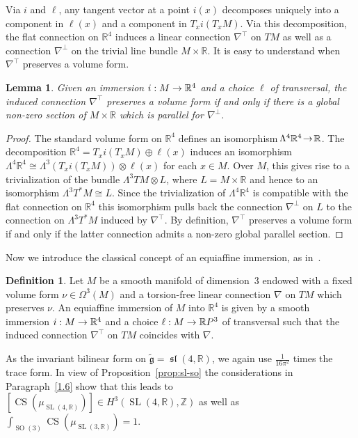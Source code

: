 \documentclass[10pt,a4paper]{amsart}
\newcommand{\x}{\times}
\newcommand{\La}{\Lambda}
\newcommand{\Om}{\Omega}
\DeclareMathOperator{\CS}{CS}
\DeclareMathOperator{\SO}{SO}
\DeclareMathOperator{\SL}{SL}
\DeclareMathOperator{\fksl}{\mathfrak{sl}}
\newcommand*{\R}{\mathbb{R}}
\newcommand{\Z}{\mathbb{Z}}
\newcommand{\tfg}{\widetilde{\mathfrak g}}
\renewcommand*{\to}{\mathchoice{\longrightarrow}{\rightarrow}{\rightarrow}{\rightarrow}}
\newtheorem{lemm}[theo]{Lemma}
\theoremstyle{definition}\newtheorem{defi}[theo]{Definition}
\begin{document}
Via $i$ and $\ell$, any tangent vector at a point $i(x)$ decomposes uniquely into a component in $\ell(x)$ and a component in $T_xi(T_xM)$. Via this decomposition, the flat connection on $\R^4$ induces a linear connection $\nabla^\top$ on $TM$ as well as a connection $\nabla^\perp$ on the trivial line bundle $M\x\R$. It is easy to understand when $\nabla^\top$ preserves a volume form.

\begin{lemm}\label{lemma:volume}
Given an immersion $i: M\to\R^4$ and a choice $\ell$ of transversal, the induced connection $\nabla^\top$ preserves a volume form if and only if there is a global non-zero section of $M\x\R$ which is parallel for $\nabla^\perp$.
\end{lemm}

\begin{proof}
The standard volume form on $\R^4$ defines an isomorphism $\!\Lambda^4\R^4\!\to\!\R$. The decomposition $\R^4\!=\!T_xi(T_xM)\!\oplus\!\ell(x)$ induces an isomorphism $\Lambda^4\R^4\!\cong\! \Lambda^3(T_xi(T_xM))\otimes\ell(x)$ for each $x\in M$. Over $M$, this gives rise to a trivialization of the bundle $\La^3TM\otimes L$, where $L=M\x\R$ and hence to an isomorphism $\La^3T^*M\cong L$. Since the trivialization of $\La^4\R^4$ is compatible with the flat connection on $\R^4$ this isomorphism pulls back the connection $\nabla^\perp$ on $L$ to the connection on $\La^3T^*M$ induced by $\nabla^\top$. By definition, $\nabla^\top$ preserves a volume form if and only if the latter connection admits a non-zero global parallel section.
\end{proof}

Now we introduce the classical concept of an equiaffine immersion, as in~\cite[Definition~1.4]{MR1311248}.

\begin{defi}\label{def:equiaffine}
Let $M$ be a smooth manifold of dimension~$3$ endowed with a fixed volume form $\nu\in\Om^3(M)$ and a torsion-free linear connection $\nabla$ on $TM$ which preserves $\nu$. An equiaffine immersion of $M$ into $\R^4$ is given by a smooth immersion $i: M\to\R^4$ and a choice $\ell: M\to\R P^3$ of transversal such that the induced connection $\nabla^\top$ on $TM$ coincides with $\nabla$.
\end{defi}

As the invariant bilinear form on $\tfg=\fksl(4,\R)$, we again use $\frac{1}{16\pi^2}$ times the trace form. In view of Proposition~\ref{prop:sl-so} the considerations in Paragraph~\ref{1.6} show that this leads to $[\CS(\mu_{\SL(4,\R)})]\in H^3(\SL(4,\R),\Z)$ as well as $\int_{\SO(3)}\CS(\mu_{\SL(3,\R)})=1$.
\end{document}
